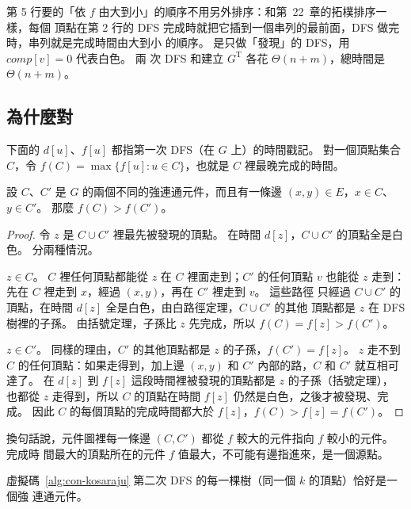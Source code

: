 第 5 行要的「依 $f$ 由大到小」的順序不用另外排序：和第~22~章的拓樸排序一樣，每個
頂點在第 2 行的 DFS 完成時就把它插到一個串列的最前面，DFS 做完時，串列就是完成時間由大到小
的順序。  是只做「發現」的 DFS，用 $\mathit{comp}[v] = 0$ 代表白色。 兩
次 DFS 和建立 $G^{\mathrm{T}}$ 各花 $\Theta(n + m)$，總時間是 $\Theta(n + m)$。

\subsection{為什麼對}

下面的 $d[u]$、$f[u]$ 都指第一次 DFS（在 $G$ 上）的時間戳記。 對一個頂點集合 $C$，令
$f(C) = \max\{f[u] : u \in C\}$，也就是 $C$ 裡最晚完成的時間。

\begin{lemma}
\label{lem:con-finish}
設 $C$、$C'$ 是 $G$ 的兩個不同的強連通元件，而且有一條邊 $(x, y) \in E$，$x \in C$、
$y \in C'$。 那麼 $f(C) > f(C')$。
\end{lemma}

\begin{proof}
令 $z$ 是 $C \cup C'$ 裡最先被發現的頂點。 在時間 $d[z]$，$C \cup C'$ 的頂點全是白
色。 分兩種情況。

\textbf{$z \in C$}。 $C$ 裡任何頂點都能從 $z$ 在 $C$ 裡面走到；$C'$ 的任何頂點 $v$
也能從 $z$ 走到：先在 $C$ 裡走到 $x$，經過 $(x, y)$，再在 $C'$ 裡走到 $v$。 這些路徑
只經過 $C \cup C'$ 的頂點，在時間 $d[z]$ 全是白色，由白路徑定理，$C \cup C'$ 的其他
頂點都是 $z$ 在 DFS 樹裡的子孫。 由括號定理，子孫比 $z$ 先完成，所以 $f(C) = f[z] >
f(C')$。

\textbf{$z \in C'$}。 同樣的理由，$C'$ 的其他頂點都是 $z$ 的子孫，$f(C') = f[z]$。
$z$ 走不到 $C$ 的任何頂點：如果走得到，加上邊 $(x, y)$ 和 $C'$ 內部的路，$C$ 和 $C'$
就互相可達了。 在 $d[z]$ 到 $f[z]$ 這段時間裡被發現的頂點都是 $z$ 的子孫（括號定理），
也都從 $z$ 走得到，所以 $C$ 的頂點在時間 $f[z]$ 仍然是白色，之後才被發現、完成。 因此
$C$ 的每個頂點的完成時間都大於 $f[z]$，$f(C) > f[z] = f(C')$。
\end{proof}

換句話說，元件圖裡每一條邊 $(C, C')$ 都從 $f$ 較大的元件指向 $f$ 較小的元件。 完成時
間最大的頂點所在的元件 $f$ 值最大，不可能有邊指進來，是一個源點。

\begin{theorem}
\label{thm:con-kosaraju}
虛擬碼~\ref{alg:con-kosaraju} 第二次 DFS 的每一棵樹（同一個 $k$ 的頂點）恰好是一個強
連通元件。
\end{theorem}

